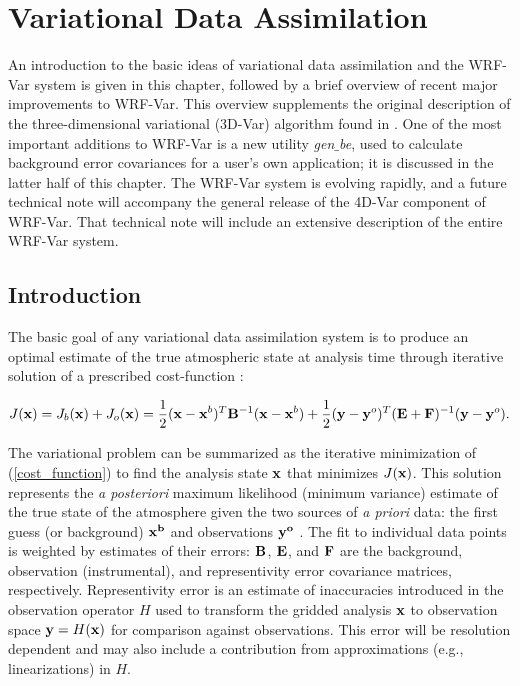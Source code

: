 \chapter{Variational Data Assimilation}
\label{var_chap}

An introduction to the basic ideas of variational data assimilation and
the WRF-Var system is given in this chapter, followed by a brief
overview of recent major improvements to WRF-Var.  This overview
supplements the original description of the three-dimensional
variational (3D-Var) algorithm found in \citet{barker04}.  One of the
most important additions to WRF-Var is a new utility {\it gen$\_$be},
used to calculate background error covariances for a user's own
application; it is discussed in the latter half of this chapter.  The
WRF-Var system is evolving rapidly,
and a future technical note will accompany the general release of the
4D-Var component of WRF-Var.  That technical note will include an
extensive description of the entire WRF-Var system.

\section{Introduction}
\label{var-intro}

The basic goal of any variational data assimilation system is to produce
an optimal estimate of the true atmospheric state at analysis time
through iterative solution of a prescribed cost-function \citep{ide97}:

\begin{equation}
J({\bf x}) = J_b({\bf x}) + J_o({\bf x}) = \frac{1}{2 
} ({\bf x}-{\bf x}^{b})^{T}{\bf B}^{-1}({\bf x}-{\bf x}^{b}) + 
\frac{1}{2}
({\bf y}-{\bf y}^{o})^{T}({\bf E+F})^{-1}({\bf y}-{\bf y}^{o}).
\label{cost_function}
\end{equation}

The variational problem can be summarized as the iterative minimization
of (\ref{cost_function}) to find the analysis state ${\bf x}$ that
minimizes $J({\bf x})$. This solution represents the {\it a posteriori}
maximum likelihood (minimum variance) estimate of the true state of the
atmosphere given the two sources of {\it a priori} data: the first guess
(or background) ${\bf x^{b}}$ and observations ${\bf y^{o}}$
\citep{lorenc86}. The fit to individual data points is weighted by
estimates of their errors: ${\bf B}$, ${\bf E}$, and ${\bf F}$ are the
background, observation (instrumental), and representivity error
covariance matrices, respectively. Representivity error is an estimate of
inaccuracies introduced in the observation operator $H$ used to
transform the gridded analysis ${\bf x}$ to observation space ${\bf
y}=H({\bf x})$ for comparison against observations. This error will be
resolution dependent and may also include a contribution from
approximations (e.g., linearizations) in $H$.

